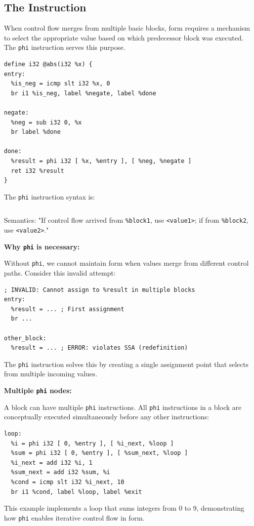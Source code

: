 \subsection{The  Instruction}

When control flow merges from multiple basic blocks,  form requires a mechanism to select the appropriate value based on which predecessor block was executed. The \texttt{phi} instruction serves this purpose.

\begin{lstlisting}[style=ir]
define i32 @abs(i32 %x) {
entry:
  %is_neg = icmp slt i32 %x, 0
  br i1 %is_neg, label %negate, label %done

negate:
  %neg = sub i32 0, %x
  br label %done

done:
  %result = phi i32 [ %x, %entry ], [ %neg, %negate ]
  ret i32 %result
}
\end{lstlisting}

The \texttt{phi} instruction syntax is:

\begin{lstlisting}[style=ir]
%result = phi <type> [ <value1>, %block1 ], [ <value2>, %block2 ], ...
\end{lstlisting}

Semantics: "If control flow arrived from \texttt{\%block1}, use \texttt{<value1>}; if from \texttt{\%block2}, use \texttt{<value2>}."

\textbf{Why \texttt{phi} is necessary:}

Without \texttt{phi}, we cannot maintain  form when values merge from different control paths. Consider this invalid attempt:

\begin{lstlisting}[style=ir]
; INVALID: Cannot assign to %result in multiple blocks
entry:
  %result = ... ; First assignment
  br ...

other_block:
  %result = ... ; ERROR: violates SSA (redefinition)
\end{lstlisting}

The \texttt{phi} instruction solves this by creating a single assignment point that selects from multiple incoming values.

\textbf{Multiple \texttt{phi} nodes:}

A block can have multiple \texttt{phi} instructions. All \texttt{phi} instructions in a block are conceptually executed simultaneously before any other instructions:

\begin{lstlisting}[style=ir]
loop:
  %i = phi i32 [ 0, %entry ], [ %i_next, %loop ]
  %sum = phi i32 [ 0, %entry ], [ %sum_next, %loop ]
  %i_next = add i32 %i, 1
  %sum_next = add i32 %sum, %i
  %cond = icmp slt i32 %i_next, 10
  br i1 %cond, label %loop, label %exit
\end{lstlisting}

This example implements a loop that sums integers from 0 to 9, demonstrating how \texttt{phi} enables iterative control flow in  form.
